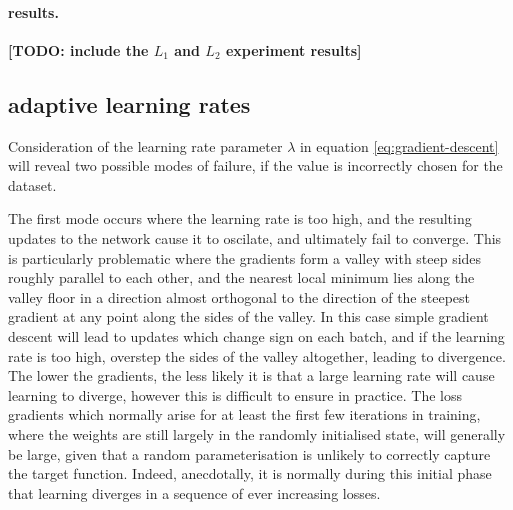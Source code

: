 \documentclass[msc]{infthesis}
\newcommand{\TODO}[1]{\textbf{[TODO: {#1}]}}
\begin{document}
\paragraph*{results.}
\TODO{include the \(L_1\) and \(L_2\) experiment results}




\subsection{adaptive learning rates}
\label{sec:classification:2-5}


Consideration of the learning rate parameter \(\lambda\) in equation \ref{eq:gradient-descent}
will reveal two possible modes of failure, if the value is incorrectly chosen for the dataset.

The first mode occurs where the learning rate is too high, and the resulting updates to the
network cause it to oscilate, and ultimately fail to converge.  This is particularly problematic
where the gradients form a valley with steep sides roughly parallel to each other, and the
nearest local minimum lies along the valley floor in a direction almost orthogonal to the
direction of the steepest gradient at any point along the sides of the valley.  In this case
simple gradient descent will lead to updates which change sign on each batch, and if the
learning rate is too high, overstep the sides of the valley altogether, leading to divergence.
%
The lower the gradients, the less likely it is that a large learning rate will cause learning to
diverge, however this is difficult to ensure in practice.  The loss gradients which normally
arise for at least the first few iterations in training, where the weights are still largely in
the randomly initialised state, will generally be large, given that a random parameterisation is
unlikely to correctly capture the target function.  Indeed, anecdotally, it is normally during
this initial phase that learning diverges in a sequence of ever increasing losses.
\end{document}
